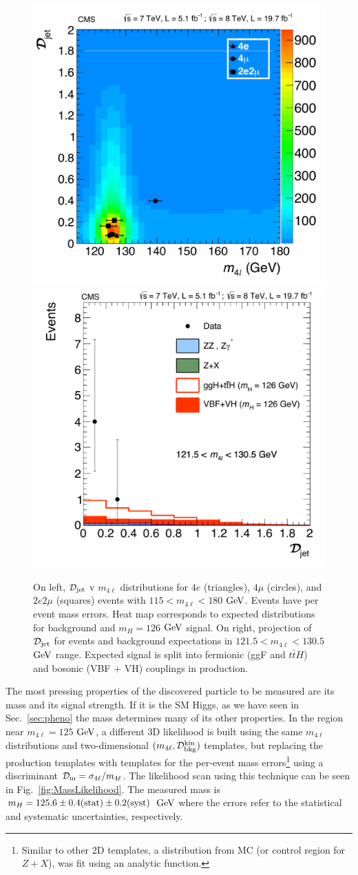 \begin{figure}[htbp]
\begin{center}
\includegraphics[width=.45\linewidth]{HiggsDiscovery/figures/M4l_vs_Fisher_all.pdf}
\includegraphics[width=.45\linewidth]{HiggsDiscovery/figures/FisherPeak.pdf}
\caption[Observed $\mathcal{D}_{\rm jet}$ Distributions for Low Mass $4\ell$ Events With Signal Expectations]{On left, $\mathcal{D}_{\rm jet}$ v $m_{4\ell}$ distributions for $4e$ (triangles), $4\mu$ (circles), and $2e2\mu$ (squares) events with $115 < m_{4\ell} < 180$ $\rm{GeV}$. Events have per event mass errors. Heat map corresponds to expected distributions for background and $m_H = 126$ $\rm{GeV}$ signal. On right, projection of $\mathcal{D}_{\rm jet}$ for events and background expectations in $121.5 < m_{4\ell} < 130.5$ $\rm{GeV}$ range. Expected signal is split into fermionic (ggF and $t\bar{t}H$) and bosonic (VBF + VH) couplings in production.}
\label{fig:Fisher_Results}
\end{center}
\end{figure}

The most pressing properties of the discovered particle to be measured are its mass and its signal strength. If it is the SM Higgs, as we have seen in Sec.~\ref{sec:pheno} the mass determines many of its other properties. In the region near $m_{4\ell}=125$ $\rm{GeV}$, a different 3D likelihood is built using the same $m_{4\ell}$ distributions and two-dimensional $(m_{4\ell},\mathcal{D}_{\rm{bkg}}^{\rm{kin}})$ templates, but replacing the production templates with templates for the per-event mass errors\footnote{Similar to other 2D templates, a distribution from MC (or control region for $Z+X$), was fit using an analytic function.} using a discriminant $\mathcal{D}_{\rm{m}}=\sigma_{4\ell}/m_{4\ell}$. The likelihood scan using this technique can be seen in Fig.~\ref{fig:MassLikelihood}. The measured mass is $m_H = 125.6 \pm 0.4(\rm{stat}) \pm 0.2(\rm{syst})$ $\rm{GeV}$ where the errors refer to the statistical and systematic uncertainties, respectively.

